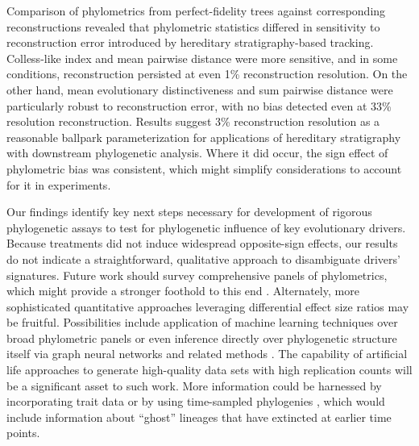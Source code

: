 Comparison of phylometrics from perfect-fidelity trees against corresponding reconstructions revealed that phylometric statistics differed in sensitivity to reconstruction error introduced by hereditary stratigraphy-based tracking.
Colless-like index and mean pairwise distance were more sensitive, and in some conditions, reconstruction persisted at even 1\% reconstruction resolution.
On the other hand, mean evolutionary distinctiveness and sum pairwise distance were particularly robust to reconstruction error, with no bias detected even at 33\% resolution reconstruction.
Results suggest 3\% reconstruction resolution as a reasonable ballpark parameterization for applications of hereditary stratigraphy with downstream phylogenetic analysis.
Where it did occur, the sign effect of phylometric bias was consistent, which might simplify considerations to account for it in experiments.

Our findings identify key next steps necessary for development of rigorous phylogenetic assays to test for phylogenetic influence of key evolutionary drivers.
Because treatments did not induce widespread opposite-sign effects, our results do not indicate a straightforward, qualitative approach to disambiguate drivers' signatures.
Future work should survey comprehensive panels of phylometrics, which might provide a stronger foothold to this end \citep{tuckerGuidePhylogeneticMetrics2017}.
Alternately, more sophisticated quantitative approaches leveraging differential effect size ratios may be fruitful.
Possibilities include application of machine learning techniques over broad phylometric panels \citep{voznica2022deep} or even inference directly over phylogenetic structure itself via graph neural networks and related methods \citep{lajaaiti2023comparison}.
The capability of artificial life approaches to generate high-quality data sets with high replication counts will be a significant asset to such work.
More information could be harnessed by incorporating trait data \citep{nozoe2017inferring} or by using time-sampled phylogenies \citep{volz2013viral}, which would include information about ``ghost'' lineages that have extincted at earlier time points.

